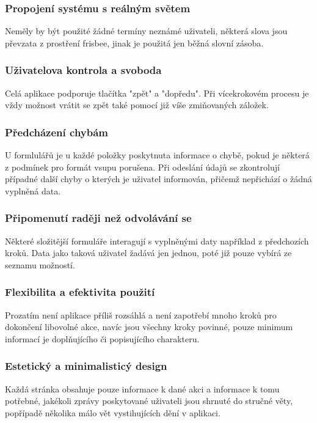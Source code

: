 \documentclass[thesis=B,czech]{FITthesis}[2012/06/26]
\begin{document}
	\subsubsection{Propojení systému s reálným světem}
	Neměly by být použité žádné termíny neznámé uživateli, některá slova jsou převzata z prostření frisbee, jinak je použitá jen běžná slovní zásoba.

	\subsubsection{Uživatelova kontrola a svoboda}
	Celá aplikace podporuje tlačítka "zpět" a "dopředu". Při vícekrokovém procesu je vždy možnost vrátit se zpět také pomocí již víše zmiňovaných záložek.

	\subsubsection{Předcházení chybám}
	U formlulářů je u každé položky poskytnuta informace o chybě, pokud je některá z podmínek pro formát vsupu porušena. Při odeslání údajů se zkontrolují případné další chyby o kterých je uživatel informován, přičemž nepřichází o žádná vyplněná data.

	\subsubsection{Připomenutí raději než odvolávání se}
	Některé složitější formuláře interagují s vyplněnými daty například z předchozích kroků. Data jako taková uživatel žadává jen jednou, poté již pouze vybírá ze seznamu možností.

	\subsubsection{Flexibilita a efektivita použití}
	Prozatím není aplikace příliš rozsáhlá a není zapotřebí mnoho kroků pro dokončení libovolné akce, navíc jsou všechny kroky povinné, pouze minimum informací je doplňujícího či popisujícího charakteru.

	\subsubsection{Estetický a minimalisticý design}
	Každá stránka obsahuje pouze informace k dané akci a informace k tomu potřebné, jakékoli zprávy poskytované uživateli jsou shrnuté do stručné věty, popřípadě několika málo vět vystihujících dění v aplikaci.
\end{document}
